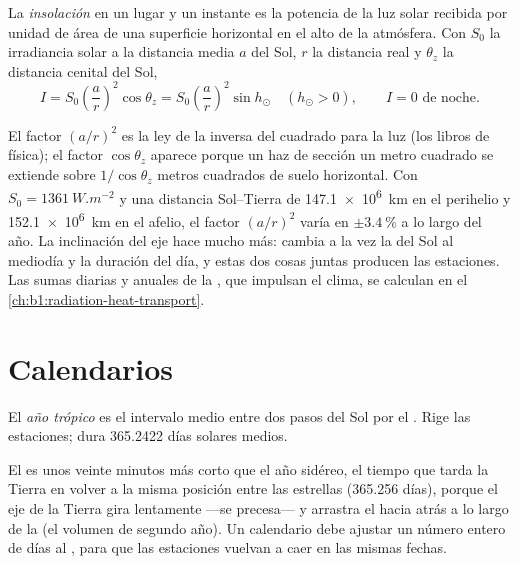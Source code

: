 \begin{definition}[Insolación]\label{def:b1:spherical-astronomy:insolation}
La \emph{insolación} en un lugar y un instante es la potencia de
la luz solar recibida por unidad de área de una superficie horizontal en el alto de
la atmósfera. Con $S_0$ la irradiancia solar a la distancia media $a$ del Sol, $r$
la distancia real y $\theta_z$ la distancia cenital del Sol,
\[
  I = S_0\left(\frac{a}{r}\right)^{2}\cos\theta_z = S_0\left(\frac{a}{r}\right)^{2}\sin h_\odot
  \quad (h_\odot > 0), \qquad I = 0 \text{ de noche}.
\]
\end{definition}

El factor $(a/r)^2$ es la ley de la inversa del cuadrado para la luz (los libros de
física); el factor $\cos\theta_z$ aparece porque un haz de sección un metro cuadrado
se extiende sobre $1/\cos\theta_z$ metros cuadrados de suelo horizontal. Con
$S_0 = \qty{1361}{W.m^{-2}}$ y una distancia Sol--Tierra de \qty{147.1e6}{km} en el
perihelio y \qty{152.1e6}{km} en el afelio, el factor $(a/r)^2$ varía en
$\pm\qty{3.4}{\percent}$ a lo largo del año. La inclinación del eje hace mucho más:
cambia a la vez la  del Sol al mediodía y la duración del día, y estas dos
cosas juntas producen las estaciones. Las sumas diarias y anuales de la ,
que impulsan el clima, se calculan en el
\cref{ch:b1:radiation-heat-transport}.


\section{Calendarios}

\begin{definition}\label{def:b1:spherical-astronomy:tropical-year}
El \emph{año trópico} es el intervalo medio entre dos pasos del
Sol por el . Rige las estaciones; dura 365.2422 días solares medios.
\end{definition}

El  es unos veinte minutos más corto que el año sidéreo, el tiempo que
tarda la Tierra en volver a la misma posición entre las estrellas (365.256 días),
porque el eje de la Tierra gira lentamente —se precesa— y arrastra el  hacia atrás a lo largo de la  (el volumen de segundo año). Un
calendario debe ajustar un número entero de días al , para que las
estaciones vuelvan a caer en las mismas fechas.

